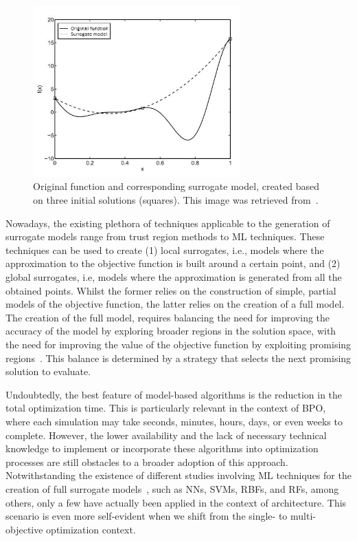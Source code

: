 	\begin{figure}
	\centering
	\includegraphics[width=8cm]{Images/Background/sbosexample.JPG}
	\caption[Example of a surrogate model]{Original function and corresponding surrogate model, created based on three initial solutions (squares). This image was retrieved from~\cite{Koziel2011}.}
	\label{fig:sbosexample}
	\end{figure}
	
	Nowadays, the existing plethora of techniques applicable to the generation of surrogate models range from trust region methods to \ac{ML} techniques. These techniques can be used to create (1) local surrogates, i.e., models where the approximation to the objective function is built around a certain point, and (2) global surrogates, i.e, models where the approximation is generated from all the obtained points. Whilst the former relies on the construction of simple, partial models of the objective function, the latter relies on the creation of a full model. The creation of the full model, requires balancing the need for improving the accuracy of the model by exploring broader regions in the solution space, with the need for improving the value of the objective function by exploiting promising regions~\cite{Koziel2011}. This balance is determined by a strategy that selects the next promising solution to evaluate.
	
	Undoubtedly, the best feature of model-based algorithms is the reduction in the total optimization time. This is particularly relevant in the context of \ac{BPO}, where each simulation may take seconds, minutes, hours, days, or even weeks to complete. However, the lower availability and the lack of necessary technical knowledge to implement or incorporate these algorithms into optimization processes are still obstacles to a broader adoption of this approach. Notwithstanding the existence of different studies involving \ac{ML} techniques for the creation of full surrogate models~\cite{Koziel2011, Forrester2009SBO}, such as \acp{NN}, \acp{SVM}, \acp{RBF}, and \acp{RF}, among others, only a few have actually been applied in the context of architecture. This scenario is even more self-evident when we shift from the single- to multi-objective optimization context.

